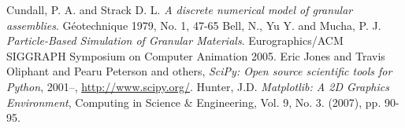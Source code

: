 \documentclass[12pt]{amsart}
\newcommand{\figref}[1]{\figurename~\ref{#1}}
\begin{document}
%
%
%
%

\begin{thebibliography}{[1]}
   Cundall, P. A. and Strack D. L. \emph{A discrete numerical model of granular assemblies}. G\'eotechnique 1979, No. 1, 47-65
   Bell, N., Yu Y. and Mucha, P. J. \emph{Particle-Based Simulation of Granular Materials}.  Eurographics/ACM SIGGRAPH Symposium on Computer Animation 2005.
   Eric Jones and Travis Oliphant and Pearu Peterson and others, \emph{{SciPy}: Open source scientific tools for {Python}}, 2001--, \url{http://www.scipy.org/}.
   Hunter, J.D. \emph{Matplotlib: A 2D Graphics Environment}, Computing in Science \& Engineering, Vol. 9, No. 3. (2007), pp. 90-95.
\end{thebibliography}
\end{document}
